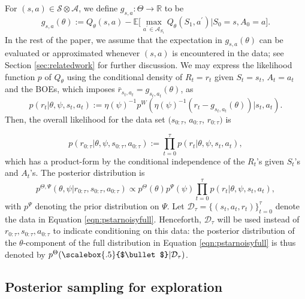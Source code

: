 \documentclass{amsart}
\renewcommand{\cdot}[1][.5]{%
  \mathbin{\vcenter{\hbox{\scalebox{#1}{$\bullet$}}}}%
}
\begin{document}
For $(s,a) \in \mathcal{S} \otimes \mathcal{A}$, we define  $g_{s,a}: \Theta \rightarrow \mathbb{R}$  to be
\begin{equation}\label{eqn:def_of_g}
g_{s,a}(\theta) := Q_\theta(s,a) - \mathbb{E}\Big[\max_{a^\prime \in \mathcal{A}_{S_{1}}}Q_\theta(S_{1}, a^\prime)\Big| S_0=s, A_0=a\Big].
\end{equation}
In the rest of the paper, we assume that the expectation in $g_{s,a}(\theta)$ can be evaluated or approximated whenever $(s,a)$ is encountered in the data; see Section \ref{sec:relatedwork} for further discussion. We may express the likelihood function $p$ of  $Q_\theta$ using the conditional density of $R_t=r_t$ given $S_t=s_t$, $A_t=a_t$ and the BOEs, which imposes $\bar{r}_{s_t,a_t}=g_{s_t,a_t}(\theta)$, as
\begin{equation}
p(r_t|\theta,\psi,s_t,a_t) := \eta(\psi)^{-1}p^W(\eta(\psi)^{-1}(r_t - g_{s_t,a_t}(\theta))|s_t,a_t). \label{eqn:llhpstarnoisy}
\end{equation}
Then, the overall likelihood for the data set $(s_{0:\tau}$, $a_{0:\tau}$, $r_{0:\tau})$ is

\begin{equation}
    p(r_{0:\tau}|\theta,\psi,s_{0:\tau},a_{0:\tau}) := \prod_{t=0}^\tau p(r_t|\theta,\psi,s_t,a_t),
    \label{eqn:llhpstarnoisyfull}
\end{equation}
which has a product-form by the conditional independence of the $R_t$'s given $S_t$'s and $A_t$'s. The posterior distribution is 
\begin{equation}
p^{\Theta,\Psi}(\theta,\psi|r_{0:\tau},s_{0:\tau},a_{0:\tau}) 
\propto p^\Theta(\theta) p^\Psi(\psi) \prod_{t=0}^\tau p(r_t|\theta,\psi,s_t,a_t),
\label{eqn:pstarnoisyfull}
\end{equation}
with $p^\Psi$ denoting the prior distribution on $\Psi$. Let $\mathcal{D}_{\tau} =\{(s_t,a_t,r_t)\}_{t=0}^{\tau}$ denote the data in Equation \ref{eqn:pstarnoisyfull}. Henceforth, $\mathcal{D}_{\tau}$ will be used instead of $r_{0:\tau},s_{0:\tau},a_{0:\tau}$ to indicate conditioning on this data: the posterior distribution of the $\theta$-component of the full distribution in Equation \ref{eqn:pstarnoisyfull} is thus denoted by  $p^\Theta(\cdot|\mathcal{D}_\tau)$.






\subsection{Posterior sampling for exploration}\label{sec:possamplingexploration}
\end{document}
